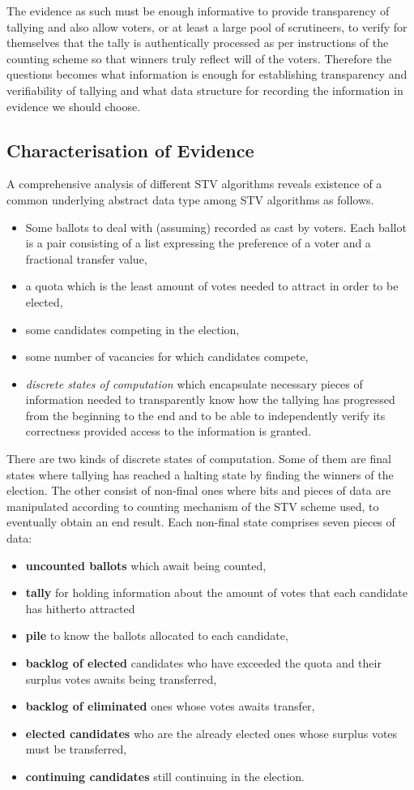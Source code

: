 \documentclass[10pt,conference]{IEEEtran}
\begin{document}
  
The evidence as such must be enough informative to provide transparency of tallying and also allow  voters, or at least a large pool of scrutineers, to verify for themselves that the tally is authentically processed as per instructions of the counting scheme  so that winners truly reflect will of the voters.    
Therefore the questions becomes what information is enough  
for establishing transparency and verifiability of tallying  and what data structure for recording the information in evidence we should choose.
\subsection{Characterisation of Evidence} 
A comprehensive analysis of different STV algorithms reveals existence of a common underlying abstract data type among STV algorithms as follows. 
\begin{itemize}
\item Some ballots to deal with (assuming) recorded as cast by voters. Each ballot is a pair consisting of a list expressing the preference of a voter and a fractional transfer value,
\item a quota which is the least amount of votes needed to attract in order to be elected, 
\item some candidates competing in the election, 
\item some number of vacancies for which candidates compete,
\item \emph{discrete states of computation} which encapsulate necessary  pieces of information needed to transparently know how the tallying has progressed from the beginning to the end and to be able to independently verify its correctness provided access to the information is granted. 
\end{itemize}
There are two kinds of discrete states of computation. Some of them are final states where tallying has reached a halting state by finding the winners of the election. The other consist of non-final ones where bits and pieces of data are manipulated according to counting mechanism of the STV scheme used, to eventually obtain an end result. Each non-final state comprises seven pieces of data: 
\begin{itemize}
 \item\textbf{uncounted ballots} which await being counted,
 \item\textbf{tally} for holding information about the amount of votes that each candidate has hitherto attracted %
 \item\textbf{pile} to know the ballots allocated to each candidate, 
 \item\textbf{backlog of elected} candidates who have exceeded the quota and their surplus votes awaits being transferred,
 \item\textbf{backlog of eliminated} ones whose votes awaits transfer,
 \item\textbf{elected candidates} who are the already elected ones whose surplus votes must be transferred,
 \item\textbf{continuing candidates} still continuing in the election. 
 \end{itemize}
\end{document}
